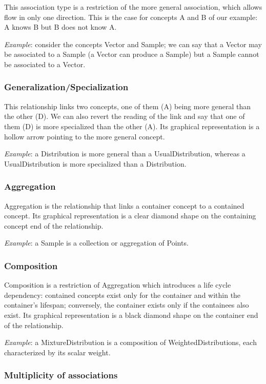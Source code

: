 This association type is a restriction of the more general association, which allows flow in only one direction. This is the case for concepts A and B of our example: A knows B but B does not know A.

\emph{Example}: consider the concepts Vector and Sample; we can say that a Vector may be associated to a Sample (a Vector can produce a Sample) but a Sample cannot be associated to a Vector.

\subsubsection{Generalization/Specialization}

This relationship links two concepts, one of them (A) being more general than the other (D). We can also revert the reading of the link and say that one of them (D) is more specialized than the other (A). Its graphical representation is a hollow arrow pointing to the more general concept.

\emph{Example}: a Distribution is more general than a UsualDistribution, whereas a UsualDistribution is more specialized than a Distribution.

\subsubsection{Aggregation}

Aggregation is the relationship that links a container concept to a contained concept. Its graphical representation is a clear diamond shape on the containing concept end of the relationship.

\emph{Example}: a Sample is a collection or aggregation of Points.

\subsubsection{Composition}

Composition is a restriction of Aggregation which introduces a life cycle dependency: contained concepts exist only for the container and within the container's lifespan; conversely, the container exists only if the containees also exist. Its graphical representation is a black diamond shape on the container end of the relationship.

\emph{Example}: a MixtureDistribution is a composition of WeightedDistributions, each characterized by its scalar weight.

\subsubsection{Multiplicity of associations}


